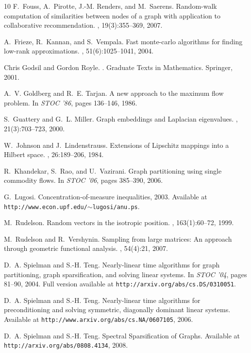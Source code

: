 \documentclass[11pt]{article}
\begin{document}
\begin{thebibliography}{10}
F.~Fouss, A.~Pirotte, J.-M. Renders, and M.~Saerens.
\newblock Random-walk computation of similarities between nodes of a graph with
  application to collaborative recommendation.
,
  19(3):355--369, 2007.

A.~Frieze, R.~Kannan, and S.~Vempala.
\newblock Fast monte-carlo algorithms for finding low-rank approximations.
, 51(6):1025--1041, 2004.

Chris Godsil and Gordon Royle.
.
\newblock Graduate Texts in Mathematics. Springer, 2001.


A.~V. Goldberg and R.~E. Tarjan.
\newblock A new approach to the maximum flow problem.
\newblock In {\em STOC '86}, pages 136--146, 1986.

S.~Guattery and G.~L. Miller.
\newblock Graph embeddings and Laplacian eigenvalues.
, 21(3):703--723, 2000.

W.~Johnson and J.~Lindenstrauss.
\newblock Extensions of Lipschitz mappings into a Hilbert space.
, 26:189--206, 1984.

R.~Khandekar, S.~Rao, and U.~Vazirani.
\newblock Graph partitioning using single commodity flows.
\newblock In {\em STOC '06}, pages 385--390, 2006.

G.~Lugosi.
\newblock Concentration-of-measure inequalities, 2003.
\newblock Available at\\ \texttt{http://www.econ.upf.edu/$\sim$lugosi/anu.ps}.

M.~Rudelson.
\newblock Random vectors in the isotropic position.
, 163(1):60--72, 1999.

M.~Rudelson and R.~Vershynin.
\newblock Sampling from large matrices: An approach through geometric
  functional analysis.
, 54(4):21, 2007.

D.~A. Spielman and S.-H. Teng.
\newblock Nearly-linear time algorithms for graph partitioning, graph
  sparsification, and solving linear systems.
\newblock In {\em STOC '04}, pages 81--90, 2004.
\newblock Full version available at
  \texttt{http://arxiv.org/abs/cs.DS/0310051}.

D.~A. Spielman and S.-H. Teng.
\newblock Nearly-linear time algorithms for preconditioning and solving
  symmetric, diagonally dominant linear systems.
\newblock Available at \texttt{http://www.arxiv.org/abs/cs.NA/0607105}, 2006.

D.~A. Spielman and S.-H. Teng.
\newblock Spectral Sparsification of Graphs.
\newblock Available at \texttt{http://arxiv.org/abs/0808.4134}, 2008.

\end{thebibliography}
\end{document}
